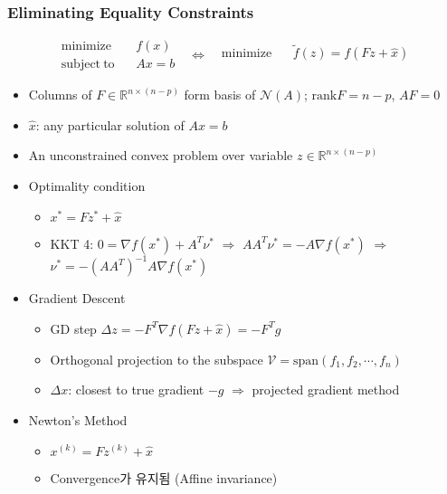 \subsubsection*{Eliminating Equality Constraints}
$$ \begin{aligned}
    \mathrm{minimize}~~&~~f(x) \\
    \mathrm{subject~to}~~&~~Ax=b
\end{aligned}~~~\Leftrightarrow~~~\begin{aligned}
    \mathrm{minimize}~~&~~\tilde{f}(z)=f(Fz+\hat{x}) \\ {}
\end{aligned} $$
\begin{itemize}
    \item Columns of $F\in\mathbb{R}^{n\times(n-p)}$ form basis of $\mathcal{N}(A)$; $\mathrm{rank}F = n-p$, $AF=0$
    \item $\hat{x}$: any particular solution of $Ax=b$
    \item An unconstrained convex problem over variable $z\in\mathbb{R}^{n\times(n-p)}$
    \item Optimality condition
    \begin{itemize}
        \item $x^\ast=Fz^\ast+\hat{x}$
        \item KKT 4: $0=\nabla f(x^\ast)+A^T\nu^\ast$ $\Rightarrow$ $AA^T\nu^\ast=-A\nabla f(x^\ast)$ $\Rightarrow$ $\nu^\ast=-(AA^T)^{-1}A\nabla f(x^\ast)$
    \end{itemize}
    \item Gradient Descent
    \begin{itemize}
        \item GD step $\Delta z=-F^T\nabla f(Fz+\hat{x})=-F^Tg$
        \item Orthogonal projection to the subspace $\mathcal{V}=\mathrm{span}(f_1,f_2,\cdots,f_n)$
        \item $\Delta x$: closest to true gradient $-g$ $\Rightarrow$ projected gradient method
    \end{itemize}
    \item Newton's Method
    \begin{itemize}
        \item $x^{(k)}=Fz^{(k)}+\hat{x}$
        \item Convergence가 유지됨 (Affine invariance)
    \end{itemize}
\end{itemize}

